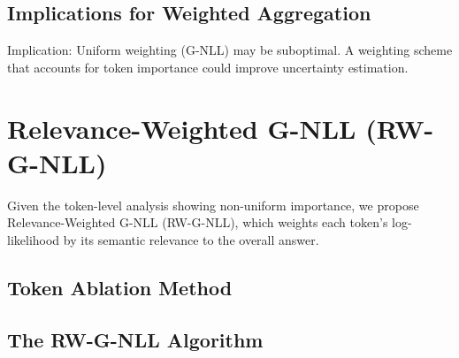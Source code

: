 \documentclass[a4paper,oneside,10pt,ngerman,english]{scrbook}
\begin{document}
\section{Implications for Weighted Aggregation}
Implication: Uniform weighting (G-NLL) may be suboptimal.
A weighting scheme that accounts for token importance could improve
uncertainty estimation.


\chapter{Relevance-Weighted G-NLL (RW-G-NLL)}
\label{ch:rwgnll}
%
Given the token-level analysis showing non-uniform importance, we propose Relevance-Weighted G-NLL (RW-G-NLL), which weights each token's log-likelihood by its semantic relevance to the overall answer.
\section{Token Ablation Method}
\section{The RW-G-NLL Algorithm}
\end{document}
